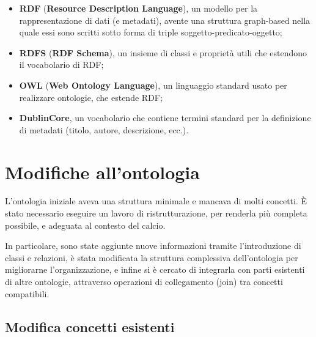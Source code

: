 \documentclass[11pt]{report} %
\begin{document}
\begin{itemize}
    \item \textbf{RDF} (\textbf{Resource Description Language}), un modello per la rappresentazione di dati (e metadati), avente una struttura graph-based nella quale essi sono scritti sotto forma di triple soggetto-predicato-oggetto;
    \item \textbf{RDFS} (\textbf{RDF Schema}), un insieme di classi e proprietà utili che estendono il vocabolario di RDF;
    \item \textbf{OWL} (\textbf{Web Ontology Language}), un linguaggio standard usato per realizzare ontologie, che estende RDF;
    \item \textbf{DublinCore}, un vocabolario che contiene termini standard per la definizione di metadati (titolo, autore, descrizione, ecc.).
\end{itemize}

\chapter{Modifiche all'ontologia}
L'ontologia iniziale aveva una struttura minimale e mancava di molti concetti.
È stato necessario eseguire un lavoro di ristrutturazione, per renderla più completa possibile, e adeguata al contesto del calcio.

\hfill

In particolare, sono state aggiunte nuove informazioni tramite l’introduzione di classi e relazioni, è stata modificata la struttura complessiva dell’ontologia per migliorarne l’organizzazione, e infine si è cercato di integrarla con parti esistenti di altre ontologie, attraverso operazioni di collegamento (join) tra concetti compatibili.
 \newpage
 \section{Modifica concetti esistenti}
\end{document}
